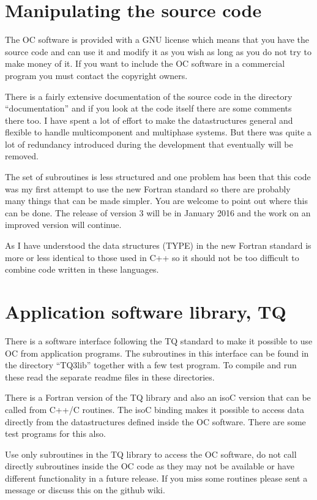 \documentclass[12pt]{article}
\begin{document}
\section{Manipulating the source code}

The OC software is provided with a GNU license which means that you
have the source code and can use it and modify it as you wish as long
as you do not try to make money of it.  If you want to include the OC
software in a commercial program you must contact the copyright
owners.

There is a fairly extensive documentation of the source code in the
directory ``documentation'' and if you look at the code itself there
are some comments there too.  I have spent a lot of effort to make the
datastructures general and flexible to handle multicomponent and
multiphase systems.  But there was quite a lot of redundancy
introduced during the development that eventually will be removed.

The set of subroutines is less structured and one problem has been
that this code was my first attempt to use the new Fortran standard so
there are probably many things that can be made simpler.  You are
welcome to point out where this can be done.  The release of version 3
will be in January 2016 and the work on an improved version will
continue.

As I have understood the data structures (TYPE) in the new Fortran
standard is more or less identical to those used in C++ so it should
not be too difficult to combine code written in these languages.

\section{Application software library, TQ}

There is a software interface following the TQ standard to make it
possible to use OC from application programs.  The subroutines in this
interface can be found in the directory ``TQ3lib'' together with a few
test program.  To compile and run these read the separate readme files
in these directories.

There is a Fortran version of the TQ library and also an isoC version
that can be called from C++/C routines.  The isoC binding makes it
possible to access data directly from the datastructures defined
inside the OC software.  There are some test programs for this also.

Use only subroutines in the TQ library to access the OC software, do
not call directly subroutines inside the OC code as they may not be
available or have different functionality in a future release.  If
you miss some routines please sent a message or discuss this on the
github wiki.
\end{document}
